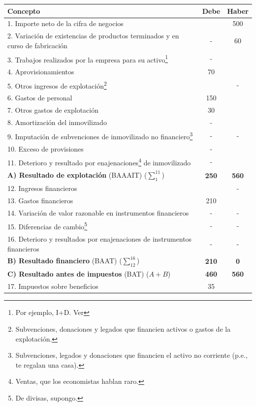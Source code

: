 \documentclass[nochap,palatino,notitlepage]{apuntes}
\begin{document}
\begin{table}[hbtp]
\centering
\begin{minipage}{\textwidth}
\footnotesize
\begin{tabular}{l|c|c}
\textbf{Concepto} & \textbf{Debe} & \textbf{Haber} \\ \toprule
1. Importe neto de la cifra de negocios & & 500 \\
2. Variación de existencias de productos terminados y en curso de fabricación & - & 60 \\
3. Trabajos realizados por la empresa para su activo\footnote{Por ejemplo, I+D. Ver } & - & \\
4. Aprovisionamientos & 70 &  \\
5. Otros ingresos de explotación\footnote{Subvenciones, donaciones y legados que financien activos o gastos de la explotación.} & & - \\
6. Gastos de personal & 150 & \\
7. Otros gastos de explotación & 30 & \\
8. Amortización del inmovilizado & - & \\
9. Imputación de subvenciones de inmovilizado no financiero\footnote{Subvenciones, legados y donaciones que financien el activo no corriente (p.e., te regalan una casa).} & - & - \\
10. Exceso de provisiones & - & \\
11. Deterioro y resultado por enajenaciones\footnote{Ventas, que los economistas hablan raro.} de inmovilizado & - & \\ \midrule
\textbf{A) Resultado de explotación} (BAAAIT) ($\sum_1^{11}$) & \textbf{250} & \textbf{560} \\ \midrule
12. Ingresos financieros & & - \\
13. Gastos financieros & 210 & \\
14. Variación de valor razonable en instrumentos financieros & - & - \\
15. Diferencias de cambio\footnote{De divisas, supongo.} & - & - \\
16. Deterioro y resultados por enajenaciones de instrumentos financieros & - & - \\ \midrule
\textbf{B) Resultado financiero} (BAAT) ($\sum_{12}^{16}$) & \textbf{210} & \textbf{0} \\ \midrule
\textbf{C) Resultado antes de impuestos} (BAT) ($A + B$) & \textbf{460} & \textbf{560} \\ \midrule
17. Impuestos sobre beneficios & 35 & \\ \midrule

\end{tabular}
\end{minipage}
\end{table}
\end{document}
